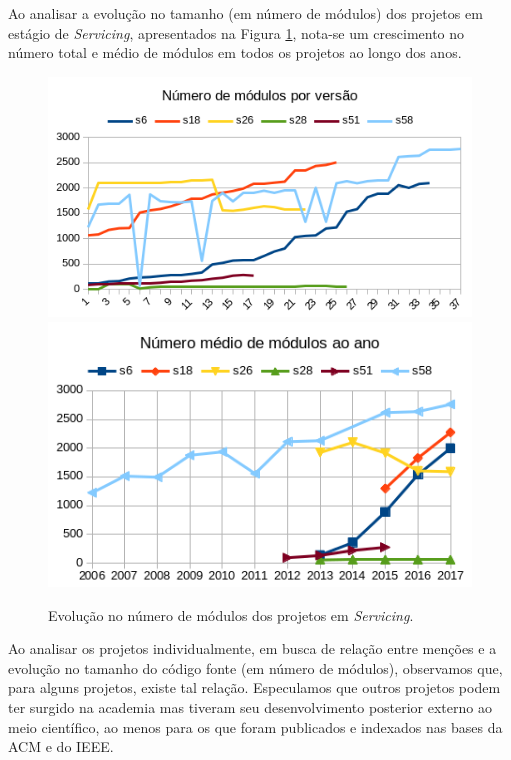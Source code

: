 Ao analisar a evolução no tamanho (em número de módulos) 
dos projetos em estágio de {\it Servicing}, apresentados na Figura \ref{modules-evolution-servicing},
nota-se um crescimento no número total e médio de módulos
em todos os projetos ao longo dos anos.

\begin{figure}[ht]
  \center
  \includegraphics[scale=0.6]{imagens/modules-evolution-servicing.png}
  \includegraphics[scale=0.6]{imagens/modules-evolution-average.png}
  \caption{Evolução no número de módulos dos projetos em \textit{Servicing}.}
  \label{modules-evolution-servicing}
\end{figure}

Ao analisar os projetos individualmente, em busca de relação entre
menções e a evolução no tamanho do código fonte (em número de módulos), 
observamos que, para alguns projetos, existe tal relação.
Especulamos que outros projetos podem ter surgido na academia mas 
tiveram seu desenvolvimento posterior externo ao meio científico, 
ao menos para os que foram publicados e indexados nas bases da ACM e do IEEE.

